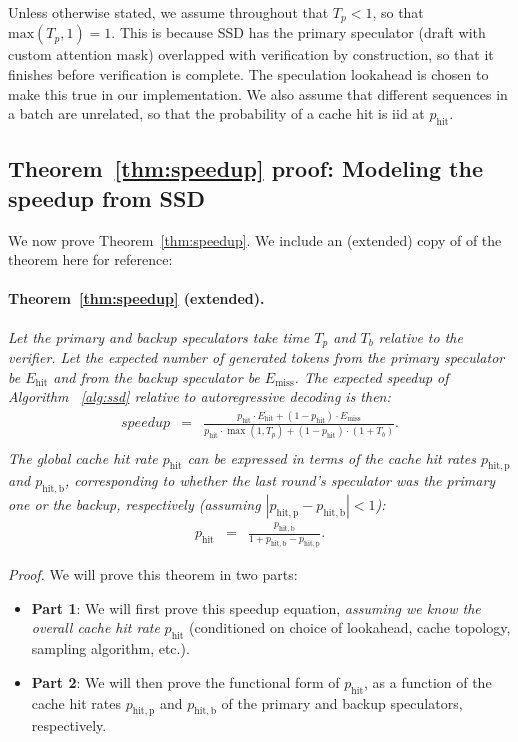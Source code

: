 Unless otherwise stated, we assume throughout that $T_p<1$, so that $\text{max}(T_p,1)=1$. This is because SSD has the primary speculator (draft with custom attention mask) overlapped with verification by construction, so that it finishes before verification is complete. The speculation lookahead is chosen to make this true in our implementation. We also assume that different sequences in a batch are unrelated, so that the probability of a cache hit is iid at $p_\text{hit}$. 

\subsection{Theorem~\ref{thm:speedup} proof: Modeling the speedup from SSD}
We now prove Theorem~\ref{thm:speedup}.
We include an (extended) copy of of the theorem here for reference:
\paragraph{Theorem~\ref{thm:speedup} (extended).}
\label{thm:speedup_app}
\textit{Let the primary and backup speculators take time $T_p$ and $T_b$ relative to the verifier.
Let the expected number of generated tokens from the primary speculator be $E_{\mathrm{hit}}$ and from the backup speculator be $E_{\mathrm{miss}}$.
The expected speedup of Algorithm ~\ref{alg:ssd} relative to autoregressive decoding is then: }
\begin{eqnarray*}
speedup &=& \frac{p_{\mathrm{hit}} \cdot E_{\mathrm{hit}} + (1-p_{\mathrm{hit}}) \cdot E_{\mathrm{miss}}}{p_{\mathrm{hit}} \cdot \max(1, T_p) + (1-p_{\mathrm{hit}}) \cdot (1 + T_b)}. \\
\end{eqnarray*}
\textit{The global cache hit rate $p_{\mathrm{hit}}$ can be expressed in terms of the cache hit rates $p_{\mathrm{hit,p}}$ and $p_{\mathrm{hit,b}}$, corresponding to whether the last round's speculator was the primary one or the backup, respectively (assuming $|p_{\mathrm{hit,p}}-p_{\mathrm{hit,b}}|<1$):}
\begin{eqnarray}
\label{eqn:phit_unconditional}
p_{\mathrm{hit}} &=& \frac{p_{\mathrm{hit,b}}}{1 + p_{\mathrm{hit,b}} - p_{\mathrm{hit,p}} }.
\end{eqnarray}

\textit{Proof.} We will prove this theorem in two parts:
\begin{itemize}
    \item \textbf{Part 1}: We will first prove this speedup equation, \textit{assuming we know the overall cache hit rate} $p_{\mathrm{hit}}$ (conditioned on choice of lookahead, cache topology, sampling algorithm, etc.).
    \item \textbf{Part 2}: We will then prove the functional form of $p_{\mathrm{hit}}$, as a function of the cache hit rates $p_{\mathrm{hit,p}}$ and $p_{\mathrm{hit,b}}$ of the primary and backup speculators, respectively.
\end{itemize}


